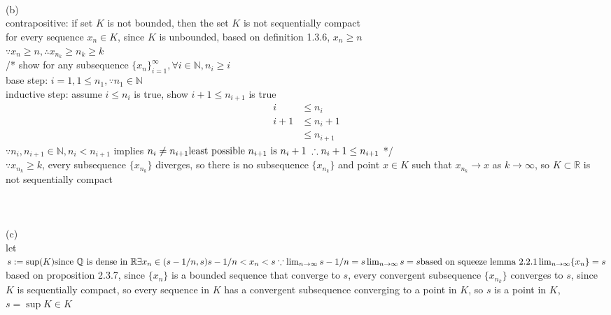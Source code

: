 \documentclass[12pt, border = 4pt, multi]{article} %
\begin{document}
\\
\\
\\
(b)\\
contrapositive: if set $K$ is not bounded, then the set $K$ is not sequentially compact\\
for every sequence $x_n \in K$, since $K$ is unbounded, based on definition 1.3.6, $x_n \geq n$\\
$\because x_n \geq n, \therefore x_{n_k} \geq n_k \geq k$\\
/* show for any subsequence $\{x_n\}_{i = 1} ^ {\infty}, \forall i \in \mathbb{N}, n_i \geq i$\\
base step: $i = 1, 1 \leq n_1, \because n_1 \in \mathbb{N}$\\
inductive step: assume $i \leq n_i$ is true, show $i + 1 \leq n_{i + 1}$ is true
\begin{align*}
i &\leq n_i\\
i + 1 &\leq n_i + 1\\
&\leq n_{i + 1}
\end{align*}
$\because n_i, n_{i + 1} \in \mathbb{N}, n_i < n_{i + 1}$ implies $n_i \not= n_{i + 1}\\
\text{least possible } n_{i + 1} \text{ is } n_i + 1\;\therefore n_i + 1 \leq n_{i + 1}$ */\\
$\because x_{n_k} \geq k$, every subsequence $\{x_{n_k}\}$ diverges, so there is no subsequence $\{x_{n_k}\}$ and point $x \in K$ such that $x_{n_k} \rightarrow x$ as $k \rightarrow \infty$, so $K \subset \mathbb{R}$ is not sequentially compact\\
\\
\\
\\
(c)\\
let $s := \sup(K)\\
\text{since } \mathbb{Q} \text{ is dense in } \mathbb{R}\\
\exists x_n \in (s - 1 / n, s)\\
s - 1 / n < x_n < s\\
\because \lim_{n \rightarrow \infty} s - 1 / n = s\\
\lim_{n \rightarrow \infty} s = s\\
\text{based on squeeze lemma 2.2.1}\\
\lim_{n \rightarrow \infty} \{x_n\} = s\\$
based on proposition 2.3.7, since $\{x_n\}$ is a bounded sequence that converge to $s$, every convergent subsequence $\{x_{n_k}\}$ converges to $s$, since $K$ is sequentially compact, so every sequence in $K$ has a convergent subsequence converging to a point in $K$, so $s$ is a point in $K$, $s = \sup K \in K$\\
\end{document}
